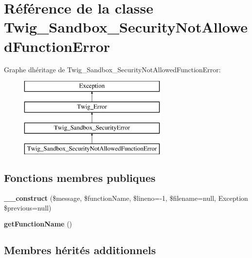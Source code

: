 \hypertarget{class_twig___sandbox___security_not_allowed_function_error}{}\section{Référence de la classe Twig\+\_\+\+Sandbox\+\_\+\+Security\+Not\+Allowed\+Function\+Error}
\label{class_twig___sandbox___security_not_allowed_function_error}
Graphe d\textquotesingle{}héritage de Twig\+\_\+\+Sandbox\+\_\+\+Security\+Not\+Allowed\+Function\+Error\+:\begin{figure}[H]
\begin{center}
\leavevmode
\includegraphics[height=4.000000cm]{class_twig___sandbox___security_not_allowed_function_error}
\end{center}
\end{figure}
\subsection*{Fonctions membres publiques}
\begin{DoxyCompactItemize}
\item 
{\bfseries \+\_\+\+\_\+construct} (\$message, \$function\+Name, \$lineno=-\/1, \$filename=null, Exception \$previous=null)\hypertarget{class_twig___sandbox___security_not_allowed_function_error_a298d4f275321abb754e9ec89d847fc4c}{}\label{class_twig___sandbox___security_not_allowed_function_error_a298d4f275321abb754e9ec89d847fc4c}

\item 
{\bfseries get\+Function\+Name} ()\hypertarget{class_twig___sandbox___security_not_allowed_function_error_aa07f3ffd609a5269623ad54a64bf04d3}{}\label{class_twig___sandbox___security_not_allowed_function_error_aa07f3ffd609a5269623ad54a64bf04d3}

\end{DoxyCompactItemize}
\subsection*{Membres hérités additionnels}


